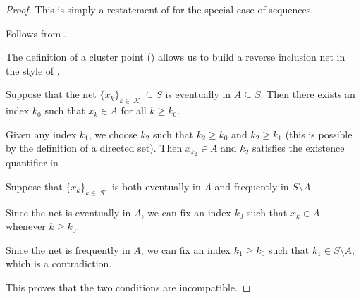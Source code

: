 \begin{proof}
   This is simply a restatement of  for the special case of sequences.

   Follows from .

  The definition of a cluster point () allows us to build a reverse inclusion net in the style of .

   Suppose that the net \( \{ x_k \}_{k \in \mscrK} \subseteq S \) is eventually in \( A \subseteq S \). Then there exists an index \( k_0 \) such that \( x_k \in A \) for all \( k \geq k_0 \).

  Given any index \( k_1 \), we choose \( k_2 \) such that \( k_2 \geq k_0 \) and \( k_2 \geq k_1 \) (this is possible by the definition of a directed set). Then \( x_{k_2} \in A \) and \( k_2 \) satisfies the existence quantifier in .

   Suppose that \( \{ x_k \}_{k \in \mscrK} \) is both eventually in \( A \) and frequently in \( S \setminus A \).

  Since the net is eventually in \( A \), we can fix an index \( k_0 \) such that \( x_k \in A \) whenever \( k \geq k_0 \).

  Since the net is frequently in \( A \), we can fix an index \( k_1 \geq k_0 \) such that \( k_1 \in S \setminus A \), which is a contradiction.

  This proves that the two conditions are incompatible.
\end{proof}

